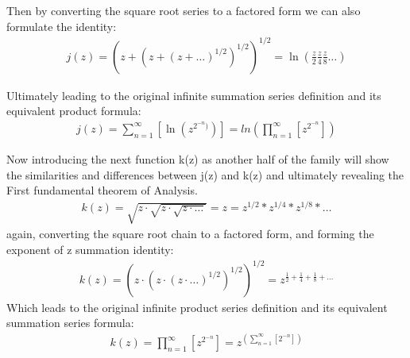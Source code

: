 \documentclass{article}
\newcommand{\sidesum}[2]{\displaystyle\sum\nolimits_{\scriptstyle #1}^{\scriptstyle #2}}
\begin{document}
Then by converting the square root series to a factored form we can also formulate the identity:
\begin{align*}
j(z) = \left(z + \left(z + \left(z + \ldots\right)^{1/2}\right)^{1/2}\right)^{1/2} = \ln(\frac{z}{2}\frac{z}{4}\frac{z}{8}\ldots)
\end{align*}

Ultimately leading to the original infinite summation series definition and its equivalent product formula:
\begin{align*}
j(z) = \sum_{n=1}^{\infty} \left[\ln\left(z^{2^{-n})}\right)\right] = ln\left(\prod_{n=1}^{\infty} \left[z^{2^{-n}}\right]\right)
\end{align*}

Now introducing the next function k(z) as another half of the family will show the similarities and differences between j(z) and k(z) and ultimately revealing the First fundamental theorem of Analysis.
\begin{align*}
k(z) = \sqrt{z \cdot \sqrt{z \cdot \sqrt{z \cdot \ldots}}} = z = z^{1/2} * z^{1/4} * z^{1/8} * \ldots
\end{align*}
again, converting the square root chain to a factored form, and forming the exponent of z summation identity:
\begin{align*}
k(z) = \left(z \cdot \left(z \cdot \left(z \cdot \ldots\right)^{1/2}\right)^{1/2}\right)^{1/2} = z^{\frac{1}{2} + \frac{1}{4} + \frac{1}{8} + \ldots}
\end{align*}
Which leads to the original infinite product series definition and its equivalent summation series formula:
\begin{align*}
k(z) = \prod_{n=1}^{\infty} \left[z^{2^{-n}}\right] = z^{(\sidesum{n=1}{\infty}[2^{-n}])}
\end{align*}
\end{document}

